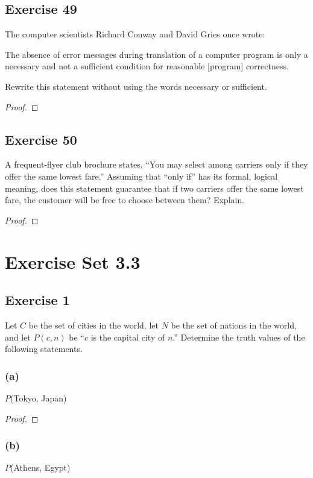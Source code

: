\documentclass[14pt]{extarticle}
\begin{document}
\subsection{Exercise 49}
The computer scientists Richard Conway and David Gries once wrote:

The absence of error messages during translation of a computer program is only a necessary and not a sufficient condition for
reasonable [program] correctness.

Rewrite this statement without using the words necessary or sufficient.

\begin{proof}

\end{proof}

\subsection{Exercise 50}
A frequent-flyer club brochure states, “You may select among carriers only if they offer the same lowest fare.” Assuming that “only if” has its formal, logical meaning, does this statement guarantee that if two carriers offer the same lowest fare, the customer will be free to choose between them? Explain.

\begin{proof}

\end{proof}

\section{Exercise Set 3.3}
\subsection{Exercise 1}
Let $C$ be the set of cities in the world, let $N$ be the set of nations in the world, and let $P(c, n)$ be “$c$ is the capital city of $n$.” Determine the truth values of the following statements.

\subsubsection{(a)}
$P$(Tokyo, Japan)

\begin{proof}

\end{proof}

\subsubsection{(b)}
$P$(Athens, Egypt)
\end{document}
